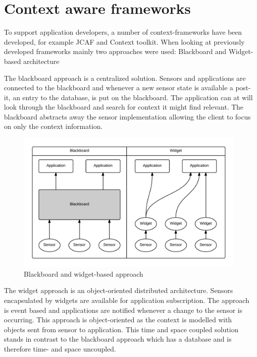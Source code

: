 \documentclass[../report.tex]{subfiles}
\begin{document}
\section{Context aware frameworks}
To support application developers, a number of context-frameworks have been developed, for example JCAF and Context toolkit. When looking at previously developed frameworks mainly two approaches were used: Blackboard and Widget-based architecture \cite{Context-aware computing (2010)}

The blackboard approach is a centralized solution. Sensors and applications are connected to the blackboard and whenever a new sensor state is available a post-it, an entry to the database, is put on the blackboard. The application can at will look through the blackboard and search for context it might find relevant. The blackboard abstracts away the sensor implementation allowing the client to focus on only the context information. 

\begin{figure}
\centering
\includegraphics[width=\linewidth]{blackboard-widget.png}
\caption{Blackboard and widget-based approach}
\label{fig:blackboard-widget}
\end{figure}

The widget approach is an object-oriented distributed architecture. Sensors encapsulated by widgets are available for application subscription. The approach is event based and applications are notified whenever a change to the sensor is occurring. This approach is object-oriented as the context is modelled with objects sent from sensor to application. This time and space coupled solution stands in contrast to the blackboard approach which has a database and is therefore time- and space uncoupled.
\end{document}

